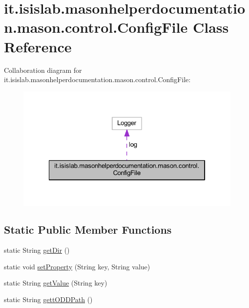\hypertarget{classit_1_1isislab_1_1masonhelperdocumentation_1_1mason_1_1control_1_1_config_file}{\section{it.\-isislab.\-masonhelperdocumentation.\-mason.\-control.\-Config\-File Class Reference}
\label{classit_1_1isislab_1_1masonhelperdocumentation_1_1mason_1_1control_1_1_config_file}
}


Collaboration diagram for it.\-isislab.\-masonhelperdocumentation.\-mason.\-control.\-Config\-File\-:
\nopagebreak
\begin{figure}[H]
\begin{center}
\leavevmode
\includegraphics[width=322pt]{classit_1_1isislab_1_1masonhelperdocumentation_1_1mason_1_1control_1_1_config_file__coll__graph}
\end{center}
\end{figure}
\subsection*{Static Public Member Functions}
\begin{DoxyCompactItemize}
\item 
static String \hyperlink{classit_1_1isislab_1_1masonhelperdocumentation_1_1mason_1_1control_1_1_config_file_afc023838475034a60185402e9cedbfba}{get\-Dir} ()
\item 
static void \hyperlink{classit_1_1isislab_1_1masonhelperdocumentation_1_1mason_1_1control_1_1_config_file_a29d4bd9c148d1d7576cef7bcaf796172}{set\-Property} (String key, String value)
\item 
static String \hyperlink{classit_1_1isislab_1_1masonhelperdocumentation_1_1mason_1_1control_1_1_config_file_a7bcf08b34e48f0c5116d796d616113f0}{get\-Value} (String key)
\item 
static String \hyperlink{classit_1_1isislab_1_1masonhelperdocumentation_1_1mason_1_1control_1_1_config_file_a066e1a4a3eb3969e1d59776ba39caac1}{gett\-O\-D\-D\-Path} ()
\end{DoxyCompactItemize}
